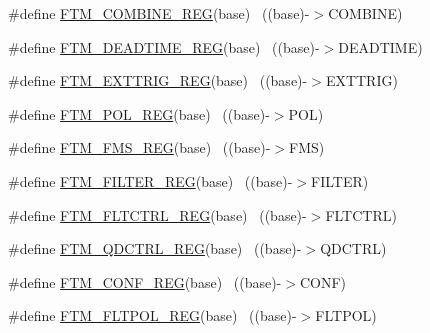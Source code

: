 \begin{DoxyCompactItemize}
\item 
\#define \hyperlink{group___f_t_m___register___accessor___macros_ga3bd7d4b2370ee66201e8d9e87e416da0}{F\+T\+M\+\_\+\+C\+O\+M\+B\+I\+N\+E\+\_\+\+R\+EG}(base)                                    ~((base)-\/$>$C\+O\+M\+B\+I\+NE)
\item 
\#define \hyperlink{group___f_t_m___register___accessor___macros_gafd613d2abdcb75b0dd32d3b045ee2192}{F\+T\+M\+\_\+\+D\+E\+A\+D\+T\+I\+M\+E\+\_\+\+R\+EG}(base)                                  ~((base)-\/$>$D\+E\+A\+D\+T\+I\+ME)
\item 
\#define \hyperlink{group___f_t_m___register___accessor___macros_ga471f91fbb0abe03bbbe568d75c5baa3b}{F\+T\+M\+\_\+\+E\+X\+T\+T\+R\+I\+G\+\_\+\+R\+EG}(base)                                    ~((base)-\/$>$E\+X\+T\+T\+R\+IG)
\item 
\#define \hyperlink{group___f_t_m___register___accessor___macros_ga8e78f5088a2e01b6857336a7290f20f0}{F\+T\+M\+\_\+\+P\+O\+L\+\_\+\+R\+EG}(base)                                            ~((base)-\/$>$P\+OL)
\item 
\#define \hyperlink{group___f_t_m___register___accessor___macros_ga2c28b40a38a76a870130b9cfda02ae6a}{F\+T\+M\+\_\+\+F\+M\+S\+\_\+\+R\+EG}(base)                                            ~((base)-\/$>$F\+MS)
\item 
\#define \hyperlink{group___f_t_m___register___accessor___macros_gae52e1c95a74f5562b3d840a82762fcfc}{F\+T\+M\+\_\+\+F\+I\+L\+T\+E\+R\+\_\+\+R\+EG}(base)                                      ~((base)-\/$>$F\+I\+L\+T\+ER)
\item 
\#define \hyperlink{group___f_t_m___register___accessor___macros_gab0a641159aeae9d56cb5b5353f3a68ec}{F\+T\+M\+\_\+\+F\+L\+T\+C\+T\+R\+L\+\_\+\+R\+EG}(base)                                    ~((base)-\/$>$F\+L\+T\+C\+T\+RL)
\item 
\#define \hyperlink{group___f_t_m___register___accessor___macros_ga998d62e98f702aca0c1f71e7699d5973}{F\+T\+M\+\_\+\+Q\+D\+C\+T\+R\+L\+\_\+\+R\+EG}(base)                                      ~((base)-\/$>$Q\+D\+C\+T\+RL)
\item 
\#define \hyperlink{group___f_t_m___register___accessor___macros_gaccd05c478b64606ec1ceb2ef17e38dc4}{F\+T\+M\+\_\+\+C\+O\+N\+F\+\_\+\+R\+EG}(base)                                          ~((base)-\/$>$C\+O\+NF)
\item 
\#define \hyperlink{group___f_t_m___register___accessor___macros_ga031ade84211f87bed77fb3b71dfa67e6}{F\+T\+M\+\_\+\+F\+L\+T\+P\+O\+L\+\_\+\+R\+EG}(base)                                      ~((base)-\/$>$F\+L\+T\+P\+OL)

\end{DoxyCompactItemize}
